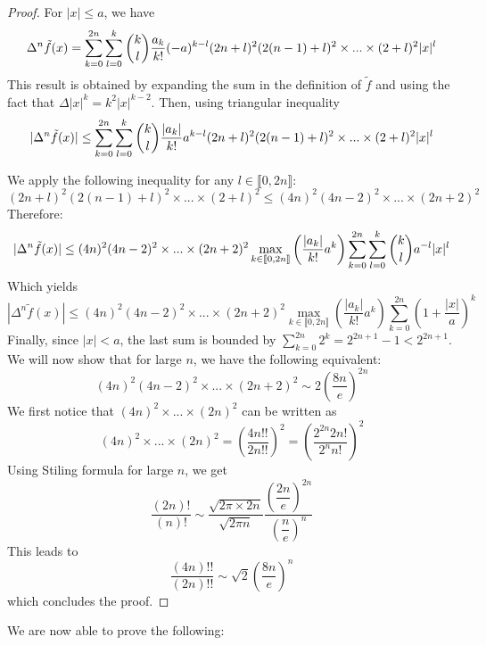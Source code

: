 \documentclass[11pt,a4paper]{article}
\begin{document}
\begin{proof} For $|x| \leq a$, we have
\[\Delta^n \tilde{f}(x) = \sum_{k=0}^{2n}\sum_{l=0}^k \dbinom{k}{l}\dfrac{a_k}{k!}(-a)^{k-l}(2n+l)^2 (2(n-1)+l)^2\times ... \times (2+l)^2 |x|^{l}\]
This result is obtained by expanding the sum in the definition of $\tilde{f}$ and using the fact that $\Delta |x|^k = k^2|x|^{k-2}$. Then, using triangular inequality
\[|\Delta^n \tilde{f}(x)| \leq \sum_{k=0}^{2n}\sum_{l=0}^k \dbinom{k}{l}\dfrac{|a_k|}{k!}a^{k-l}(2n+l)^2(2(n-1)+l)^2\times ... \times (2+l)^2|x|^{l}\]

We apply the following inequality for any $l\in\llbracket 0,2n\rrbracket$: 
\begin{equation}
(2n+l)^2(2(n-1)+l)^2\times ... \times (2+l)^2 \leq (4n)^2(4n-2)^2 \times ... \times (2n+2)^2
\label{estimationTresGrossiere}
\end{equation}
Therefore: 
\[|\Delta^n \tilde{f}(x)| \leq (4n)^2(4n-2)^2 \times ... \times (2n+2)^2\max_{k\in\llbracket 0,2n\rrbracket}\left(\dfrac{|a_k|}{k!}a^k\right)\sum_{k=0}^{2n}\sum_{l=0}^k \dbinom{k}{l}a^{-l}|x|^l\]
Which yields
\[|\Delta^n \tilde{f}(x)| \leq (4n)^2(4n-2)^2 \times ... \times (2n+2)^2\max_{k\in\llbracket 0,2n\rrbracket}\left(\dfrac{|a_k|}{k!}a^k\right)\sum_{k=0}^{2n}\left(1+\frac{|x|}{a}\right)^k\]
Finally, since $|x|<a$, the last sum is bounded by $\displaystyle\sum_{k=0}^{2n}2^k = 2^{2n+1}-1 < 2^{2n+1}$. We will now show that for large $n$, we have the following equivalent: \[(4n)^2(4n-2)^2\times...\times (2n+2)^2 \sim 2\left(\dfrac{8n}{e}\right)^{2n}\]
We first notice that $(4n)^2\times...\times (2n)^2$ can be written as \[(4n)^2\times...\times (2n)^2 = \left(\dfrac{4n!!}{2n!!}\right)^2 = \left(\dfrac{2^{2n}2n!}{2^n n!}\right)^2\]
Using Stiling formula for large $n$, we get
\[\dfrac{(2n)!}{(n)!} \sim \dfrac{\sqrt{2\pi\times 2n}}{\sqrt{2\pi n}} \dfrac{\left(\dfrac{2n}{e}\right)^{2n}}{\left(\dfrac{n}{e}\right)^{n}}\]
This leads to 
\[\dfrac{(4n)!!}{(2n)!!} \sim \sqrt{2} \left(\dfrac{8n}{e}\right)^n \]
which concludes the proof. 
\end{proof}

We are now able to prove the following: 
\end{document}
